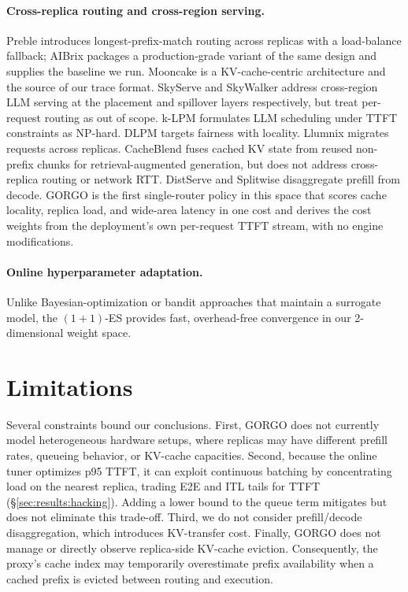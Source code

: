 \documentclass{article}
\begin{document}
\paragraph{Cross-replica routing and cross-region serving.}
Preble \citep{preble} introduces longest-prefix-match routing across replicas
with a load-balance fallback; AIBrix \citep{aibrix2024} packages a
production-grade variant of the same design and supplies the baseline we run.
Mooncake \citep{qin2024mooncake} is a KV-cache-centric architecture and the
source of our trace format. SkyServe \citep{skyserve} and SkyWalker
\citep{skywalker} address cross-region LLM serving at the placement and
spillover layers respectively, but treat per-request routing as out of scope.
k-LPM \citep{klpm2025} formulates LLM scheduling under TTFT constraints as
NP-hard. DLPM \citep{dlpm2025} targets fairness with locality. Llumnix
\citep{llumnix2024} migrates requests across replicas. CacheBlend
\citep{yao2024cacheblend} fuses cached KV state from reused non-prefix chunks
for retrieval-augmented generation, but does not address cross-replica routing
or network RTT. DistServe \citep{distserve2024} and Splitwise
\citep{splitwise2024} disaggregate prefill from decode. GORGO is the first
single-router policy in this space that scores cache locality, replica load,
and wide-area latency in one cost and derives the cost weights from the
deployment's own per-request TTFT stream, with no engine modifications.

\paragraph{Online hyperparameter adaptation.}
Unlike Bayesian-optimization or bandit approaches that maintain a surrogate
model, the $(1{+}1)$-ES \citep{rechenberg1973} provides fast, overhead-free
convergence in our 2-dimensional weight space.

\section{Limitations}
\label{sec:limitations}

Several constraints bound our conclusions. First, GORGO does not currently model heterogeneous hardware setups,
where replicas may have different prefill rates, queueing behavior, or KV-cache
capacities. Second, because the online
tuner optimizes p95 TTFT, it can exploit continuous batching by concentrating
load on the nearest replica, trading E2E and ITL tails for TTFT
(\S\ref{sec:results:hacking}). Adding a lower bound to the queue term mitigates but does not eliminate
this trade-off. Third, we do not consider prefill/decode disaggregation, which introduces
KV-transfer cost. Finally, GORGO does not manage or
directly observe replica-side KV-cache eviction. Consequently, the proxy's
cache index may temporarily overestimate prefix availability when a cached
prefix is evicted between routing and execution.
\end{document}
